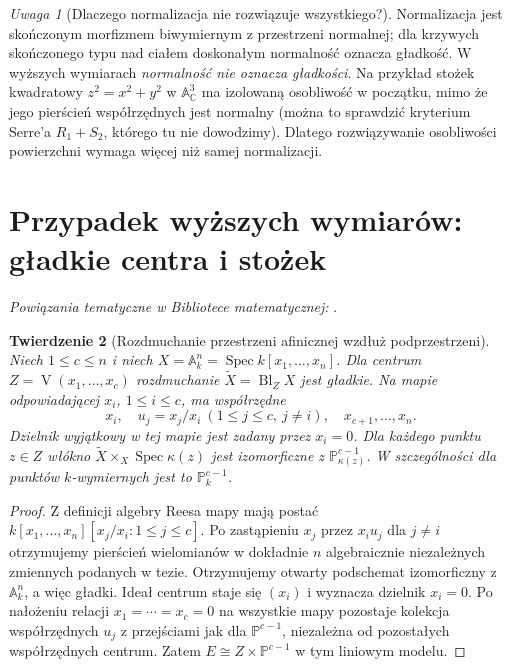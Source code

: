 \documentclass[11pt,a4paper,openany]{report}
\numberwithin{equation}{section}
\theoremstyle{plain}
\newtheorem{twierdzenie}{Twierdzenie}[section]
\theoremstyle{definition}
\theoremstyle{remark}
\newtheorem{uwaga}[twierdzenie]{Uwaga}
\newcommand{\C}{\mathbb C}
\newcommand{\A}{\mathbb A}
\newcommand{\PP}{\mathbb P}
\newcommand{\V}{\operatorname V}
\newcommand{\Spec}{\operatorname{Spec}}
\begin{document}
\begin{uwaga}[Dlaczego normalizacja nie rozwiązuje wszystkiego?]
Normalizacja jest skończonym morfizmem biwymiernym
z przestrzeni normalnej; dla krzywych skończonego typu
nad ciałem doskonałym normalność oznacza gładkość.
W wyższych wymiarach \emph{normalność nie oznacza
gładkości}. Na przykład stożek kwadratowy
$z^2=x^2+y^2$ w $\A^3_\C$ ma izolowaną osobliwość
w początku, mimo że jego pierścień współrzędnych
jest normalny (można to sprawdzić kryterium Serre'a
$R_1+S_2$, którego tu nie dowodzimy).
Dlatego rozwiązywanie osobliwości powierzchni
wymaga więcej niż samej normalizacji.
\end{uwaga}

\section{Przypadek wyższych wymiarów: gładkie centra i stożek}
\label{sec:ga5-higherdim}

\noindent\emph{Powiązania tematyczne w Bibliotece matematycznej:} .


\begin{twierdzenie}[Rozdmuchanie przestrzeni afinicznej wzdłuż podprzestrzeni]
\label{tw:ga5-smooth-center-model}
Niech $1\le c\le n$ i niech
$X=\A^n_k=\Spec k[x_1,\ldots,x_n]$.
Dla centrum $Z=\V(x_1,\ldots,x_c)$ rozdmuchanie
$\widetilde X=\operatorname{Bl}_Z X$ jest gładkie.
Na mapie odpowiadającej $x_i$, $1\le i\le c$,
ma współrzędne
\[
 x_i,\quad u_j=x_j/x_i\ (1\le j\le c,\ j\ne i),
 \quad x_{c+1},\ldots,x_n.
\]
Dzielnik wyjątkowy w tej mapie jest zadany
przez $x_i=0$. Dla każdego punktu $z\in Z$ włókno
$\widetilde X\times_X\Spec\kappa(z)$ jest izomorficzne
z $\PP^{c-1}_{\kappa(z)}$. W szczególności dla punktów
$k$-wymiernych jest to $\PP^{c-1}_k$.
\end{twierdzenie}
\begin{proof}
Z definicji algebry Reesa mapy mają postać
$k[x_1,\ldots,x_n][x_j/x_i:1\le j\le c]$.
Po zastąpieniu $x_j$ przez $x_i u_j$ dla $j\ne i$
otrzymujemy pierścień wielomianów w dokładnie
$n$ algebraicznie niezależnych zmiennych podanych
w tezie. Otrzymujemy otwarty podschemat izomorficzny
z $\A^n_k$, a więc gładki.
Ideał centrum staje się $(x_i)$ i wyznacza dzielnik
$x_i=0$. Po nałożeniu relacji $x_1=\cdots=x_c=0$
na wszystkie mapy pozostaje kolekcja współrzędnych
$u_j$ z przejściami jak dla $\PP^{c-1}$,
niezależna od pozostałych współrzędnych centrum.
Zatem $E\cong Z\times\PP^{c-1}$ w tym liniowym modelu.
\end{proof}
\end{document}
